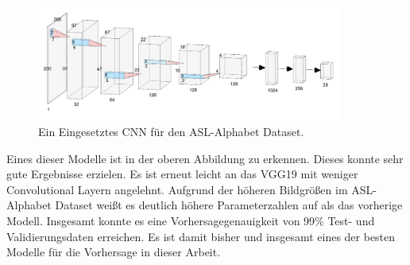 \documentclass[11pt,bibliography=totocnumbered]{scrartcl}
\begin{document}
\begin{figure}[H]
	\centering
	\includegraphics[width=0.90\textwidth]{cnn_used_kaggle_2}
	\vspace*{-3mm}
	\caption[Eingesetztes CNN für den ASL-Alphabet Dataset]{Ein Eingesetztes CNN für den ASL-Alphabet Dataset.}
	\label{fig:cnn_used_kaggle_2}
\end{figure}
\vspace*{-5mm}
Eines dieser Modelle ist in der oberen Abbildung zu erkennen. Dieses konnte sehr gute Ergebnisse erzielen. Es ist erneut leicht an das VGG19 mit weniger Convolutional Layern angelehnt. Aufgrund der höheren Bildgrößen im ASL-Alphabet Dataset weißt es deutlich höhere Parameterzahlen auf als das vorherige Modell. Insgesamt konnte es eine Vorhersagegenauigkeit von 99\% Test- und Validierungsdaten erreichen. Es ist damit bisher und insgesamt eines der besten Modelle für die Vorhersage in dieser Arbeit.
\end{document}
